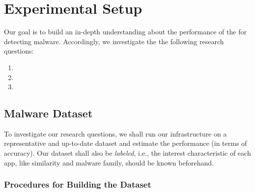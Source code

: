 \section{Experimental Setup}\label{sec:experimentalSetup}

Our goal is to build an in-depth understanding about
the performance of the \mas for detecting malware.  Accordingly,
we investigate the the following research questions:

\begin{enumerate}[(RQ1)]
\item \rqa
\item \rqc
\item \rqd
\end{enumerate}



\subsection{Malware Dataset}\label{sec:dataset}


To investigate our research questions, we shall run our infrastructure on a representative and up-to-date dataset and estimate the \mas performance (in terms of accuracy). Our dataset shall also
be \textit{labeled}, i.e., the interest characteristic of each app, like similarity and malware family, should be known beforehand. 

\subsubsection{Procedures for Building the Dataset}

